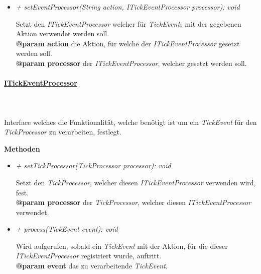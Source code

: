 \begin{itemize}
\begin{leftbar}[0.9\linewidth]
                    \end{leftbar}
                \item \textit{+ setEventProcessor(String action, ITickEventProcessor processor): void}
                    \begin{leftbar}[0.9\linewidth]
                        Setzt den \textit{ITickEventProcessor} welcher für \textit{TickEvent}s mit der gegebenen Aktion verwendet werden soll.\\
                        \textbf{@param action} die Aktion, für welche der \textit{ITickEventProcessor} gesetzt werden soll.\\
                        \textbf{@param processor} der \textit{ITickEventProcessor}, welcher gesetzt werden soll.
                    \end{leftbar}
            \end{itemize}

        \paragraph{\underline{ITickEventProcessor}} \mbox{}\\
        \\
            Interface welches die Funktionalität, welche benötigt ist um ein \textit{TickEvent} für den \textit{TickProcessor} zu verarbeiten, festlegt.\par

            \textbf{Methoden}					
            \begin{itemize}
                \item  \textit{+ setTickProcessor(TickProcessor processor): void}
                    \begin{leftbar}[0.9\linewidth]
                        Setzt den \textit{TickProcessor}, welcher diesen \textit{ITickEventProcessor} verwenden wird, fest.\\
                        \textbf{@param processor} der \textit{TickProcessor}, welcher diesen \textit{ITickEventProcessor} verwendet.
                    \end{leftbar}

                \pagebreak

                \item  \textit{+ process(TickEvent event): void}
                    \begin{leftbar}[0.9\linewidth]
                        Wird aufgerufen, sobald ein \textit{TickEvent} mit der Aktion, für die dieser \textit{ITickEventProcessor} registriert wurde, auftritt.\\
                        \textbf{@param event} das zu verarbeitende \textit{TickEvent}.
                    \end{leftbar}
            \end{itemize}

